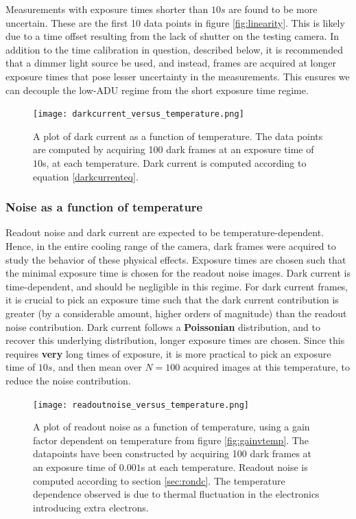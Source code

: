 \documentclass[../main.tex]{subfiles}
\begin{document}
		Measurements with exposure times shorter than $10s$ are found to be more uncertain. These are the first 10 data points in figure \ref{fig:linearity}. This is likely due to a time offset resulting from the lack of shutter on the testing camera. In addition to the time calibration in question, described below, it is recommended that a dimmer light source be used, and instead, frames are acquired at longer exposure times that pose lesser uncertainty in the measurements. This ensures we can decouple the low-ADU regime from the short exposure time regime.
		\begin{figure}[h!]
			\centering			\texttt{[image: darkcurrent\_versus\_temperature.png]}
			\caption{A plot of dark current as a function of temperature. The data points are computed by acquiring 100 dark frames at an exposure time of $10$s, at each temperature. Dark current is computed according to equation \ref{darkcurrenteq}. }
			\label{fig:darkcurrent}
		\end{figure}
		\subsubsection{Noise as a function of temperature}
		Readout noise and dark current are expected to be temperature-dependent. Hence, in the entire cooling range of the camera,  dark frames were acquired to study the behavior of these physical effects. Exposure times are chosen such that the minimal exposure time is chosen for the readout noise images. Dark current is time-dependent, and should be negligible in this regime. For dark current frames, it is crucial to pick an exposure time such that the dark current contribution is greater (by a considerable amount, higher orders of magnitude) than the readout noise contribution. Dark current follows a \textbf{Poissonian} distribution, and to recover this underlying distribution, longer exposure times are chosen. Since this requires \textbf{very} long times of exposure, it is more practical to pick an exposure time of $10s$, and then mean over $N = 100$ acquired images at this temperature, to reduce the noise contribution.
	\begin{figure}[h!]
		\centering			\texttt{[image: readoutnoise\_versus\_temperature.png]}
		\caption{A plot of readout noise as a function of temperature, using a gain factor dependent on temperature from figure \ref{fig:gainvtemp}. The datapoints have been constructed by acquiring 100 dark frames at an exposure time of $0.001$s at each temperature. Readout noise is computed according to section \ref{sec:rondc}. The temperature dependence observed is due to thermal fluctuation in the electronics introducing extra electrons. }
		\label{fig:readoutnoise}
	\end{figure}
		
\end{document}
